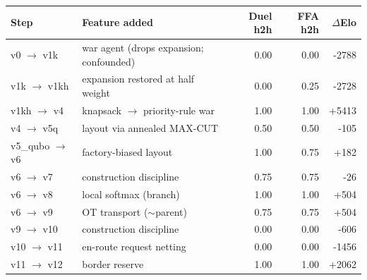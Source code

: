 \begin{tabular}{llrrr}
\toprule
Step & Feature added & Duel h2h & FFA h2h & $\Delta$Elo \\
\midrule
v0 $\to$ v1k & war agent (drops expansion; confounded) & 0.00 & 0.00 & -2788 \\
v1k $\to$ v1kh & expansion restored at half weight & 0.00 & 0.25 & -2728 \\
v1kh $\to$ v4 & knapsack $\to$ priority-rule war & 1.00 & 1.00 & +5413 \\
v4 $\to$ v5q & layout via annealed MAX-CUT & 0.50 & 0.50 & -105 \\
v5\_qubo $\to$ v6 & factory-biased layout & 1.00 & 0.75 & +182 \\
v6 $\to$ v7 & construction discipline & 0.75 & 0.75 & -26 \\
v6 $\to$ v8 & local softmax (branch) & 1.00 & 1.00 & +504 \\
v6 $\to$ v9 & OT transport ($\sim$parent) & 0.75 & 0.75 & +504 \\
v9 $\to$ v10 & construction discipline & 0.00 & 0.00 & -606 \\
v10 $\to$ v11 & en-route request netting & 0.00 & 0.00 & -1456 \\
v11 $\to$ v12 & border reserve & 1.00 & 1.00 & +2062 \\
\bottomrule
\end{tabular}
